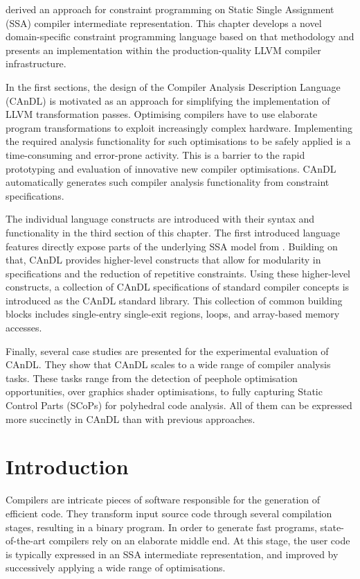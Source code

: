 
     derived an approach for constraint programming on
    Static Single Assignment (SSA) compiler intermediate representation.
    This chapter develops a novel domain-specific constraint programming
    language based on that methodology and presents an implementation within the
    production-quality LLVM compiler infrastructure.

    In the first sections, the design of the Compiler Analysis
    Description Language (CAnDL) is motivated as an approach for simplifying
    the implementation of LLVM transformation passes.
    Optimising compilers have to use elaborate program transformations to
    exploit increasingly complex hardware.
    Implementing the required analysis functionality for such optimisations to
    be safely applied is a time-consuming and error-prone activity.
    This is a barrier to the rapid prototyping and evaluation of innovative new
    compiler optimisations.
    CAnDL automatically generates such compiler analysis functionality from
    constraint specifications.

    The individual language constructs are introduced with their syntax and
    functionality in the third section of this chapter.
    The first introduced language features directly expose parts of the
    underlying SSA model from .
    Building on that, CAnDL provides higher-level constructs that allow for
    modularity in specifications and the reduction of repetitive constraints.
    Using these higher-level constructs, a collection of CAnDL specifications
    of standard compiler concepts is introduced as the CAnDL standard library.
    This collection of common building blocks includes single-entry single-exit
    regions, loops, and array-based memory accesses.

    Finally, several case studies are presented for the experimental evaluation
    of CAnDL.
    They show that CAnDL scales to a wide range of compiler analysis tasks.
    These tasks range from the detection of peephole optimisation opportunities,
    over graphics shader optimisations, to fully capturing Static Control Parts
    (SCoPs) for polyhedral code analysis.
    All of them can be expressed more succinctly in CAnDL than with previous
    approaches.

\section{Introduction}

    Compilers are intricate pieces of software responsible for the generation of
    efficient code.
    They transform input source code through several compilation stages,
    resulting in a binary program.
    In order to generate fast programs, state-of-the-art compilers rely on an
    elaborate middle end.
    At this stage, the user code is typically expressed in an SSA intermediate
    representation, and improved by successively applying a wide range of
    optimisations.

